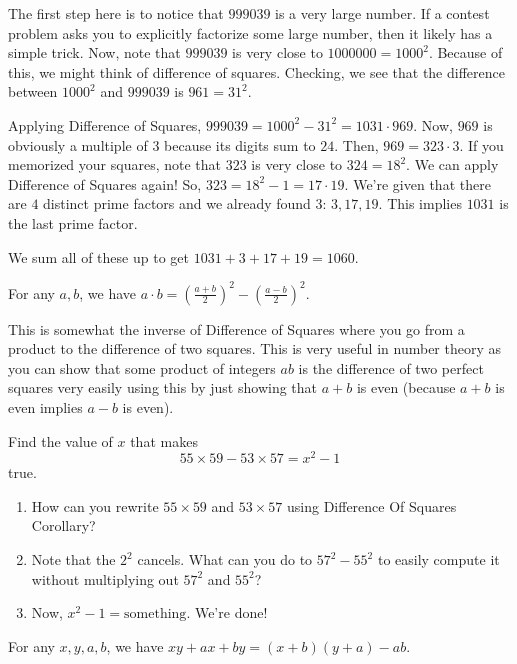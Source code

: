 \documentclass[mast]{lucky}
\begin{document}
\begin{sol}The first step here is to notice that $999039$ is a very large number. If a contest problem asks you to explicitly factorize some large number, then it likely has a simple trick. Now, note that $999039$ is very close to $1000000=1000^2$. Because of this, we might think of difference of squares. Checking, we see that the difference between $1000^2$ and $999039$ is $961=31^2$. 

Applying Difference of Squares, $999039=1000^2-31^2=1031\cdot 969$. Now, $969$ is obviously a multiple of $3$ because its digits sum to $24$. Then, $969=323\cdot 3$. If you memorized your squares, note that $323$ is very close to $324=18^2$. We can apply Difference of Squares again! So, $323=18^2-1=17\cdot 19$. We're given that there are $4$ distinct prime factors and we already found $3$: $3,17,19$. This implies $1031$ is the last prime factor.

We sum all of these up to get $1031+3+17+19={1060}$.
\end{sol}

\begin{theo}
For any $a,b$, we have $a\cdot b = (\frac{a+b}{2})^2-(\frac{a-b}{2})^2$.
\end{theo}
This is somewhat the inverse of Difference of Squares where you go from a product to the difference of two squares. This is very useful in number theory as you can show that some product of integers $ab$ is the difference of two perfect squares very easily using this by just showing that $a+b$ is even (because $a+b$ is even implies $a-b$ is even).

\begin{exam}
Find the value of $x$ that makes
$$55\times 59-53\times 57=x^2-1$$
true.
\end{exam}
\begin{walk}
\begin{enumerate}
    \item How can you rewrite $55\times 59$ and $53\times 57$ using Difference Of Squares Corollary?
    \item Note that the $2^2$ cancels. What can you do to $57^2-55^2$ to easily compute it without multiplying out $57^2$ and $55^2$?
    \item Now, $x^2-1=\text{something}$. We're done!
\end{enumerate}
\end{walk}

\begin{theo}
For any $x,y,a,b$, we have $xy+ax+by=(x+b)(y+a)-ab$.
\end{theo}
\end{document}
